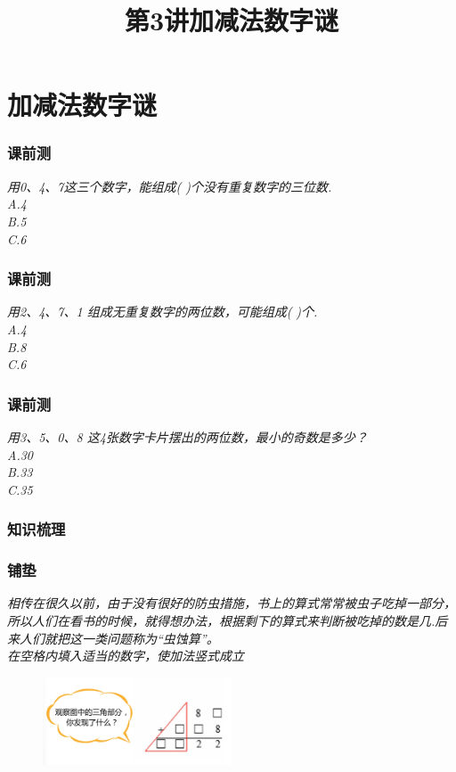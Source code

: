 \section{加减法数字谜}

\title[第3讲\quad 加减法数字谜]{第3讲\quad 加减法数字谜} 
\author{}
\date{}
\begin{frame}
    \titlepage
\end{frame}

\begin{frame}
    \frametitle{课前测}
    \textit{用0、4、7这三个数字，能组成( )个没有重复数字的三位数.\\
    A.4\\ 
    B.5\\ 
    C.6}
\end{frame}

\begin{frame}
    \frametitle{课前测}
    \textit{用2、4、7、1 组成无重复数字的两位数，可能组成( )个.\\
    A.4\\ 
    B.8\\ 
    C.6}
\end{frame}

\begin{frame}
    \frametitle{课前测}
    \textit{用3、5、0、8 这4张数字卡片摆出的两位数，最小的奇数是多少？\\
    A.30\\ 
    B.33\\ 
    C.35}
\end{frame}

\begin{frame}
    \frametitle{知识梳理}
\end{frame}

\begin{frame}
    \frametitle{铺垫}
    \textit{相传在很久以前，由于没有很好的防虫措施，书上的算式常常被虫子吃掉一部分，所以人们在看书的时候，就得想办法，根据剩下的算式来判断被吃掉的数是几.后来人们就把这一类问题称为“虫蚀算”。\\
    在空格内填入适当的数字，使加法竖式成立}
    \begin{figure}[H] 
        \centering
        \includegraphics[width=0.5\textwidth]{./pics/Chapter_3/pudian.png}
    \end{figure}
\end{frame}

